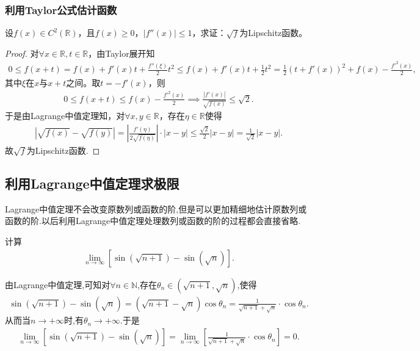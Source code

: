 \documentclass[../../main.tex]{subfiles}%
\begin{document}
\subsubsection{利用Taylor公式估计函数}

\begin{example}
设$f(x)\in C^2(\mathbb{R})$，且$f(x)\geqslant 0$，$|f''(x)|\leqslant 1$，求证：$\sqrt{f}$为Lipschitz函数。
\end{example}
\begin{proof}
对$\forall x\in\mathbb{R}, t\in\mathbb{R}$，由Taylor展开知
\begin{align*}
0\leqslant f(x+t)=f(x)+f'(x)t+\frac{f''(\xi)}{2}t^2\leqslant f(x)+f'(x)t+\frac{1}{2}t^2
= \frac{1}{2}(t+f'(x))^2 + f(x) - \frac{f'^2(x)}{2},
\end{align*}
其中$\xi$在$x$与$x+t$之间。取$t=-f'(x)$，则
\begin{align*}
0\leqslant f(x+t)\leqslant f(x) - \frac{f'^2(x)}{2} \implies \frac{|f'(x)|}{\sqrt{f(x)}}\leqslant \sqrt{2}.
\end{align*}
于是由Lagrange中值定理知，对$\forall x,y\in\mathbb{R}$，存在$\eta\in\mathbb{R}$使得
\begin{align*}
|\sqrt{f(x)} - \sqrt{f(y)}| = \left|\frac{f'(\eta)}{2\sqrt{f(\eta)}}\right|\cdot |x-y| \leqslant \frac{\sqrt{2}}{2}|x-y| = \frac{1}{\sqrt{2}}|x-y|.
\end{align*}
故$\sqrt{f}$为Lipschitz函数.
\end{proof}



\subsection{利用Lagrange中值定理求极限}
Lagrange中值定理不会改变原数列或函数的阶,但是可以更加精细地估计原数列或函数的阶.以后利用Lagrange中值定理处理数列或函数的阶的过程都会直接省略.

\begin{example}
计算
\begin{align*}
\lim_{n \to \infty} [\sin(\sqrt{n + 1}) - \sin(\sqrt{n})].
\end{align*}
\end{example}
\begin{solution}
由Lagrange中值定理,可知对$\forall n\in\mathbb{N}$,存在$\theta_n \in(\sqrt{n+1},\sqrt{n})$,使得
\begin{align*}
\sin(\sqrt{n+1})-\sin(\sqrt{n})=(\sqrt{n+1}-\sqrt{n})\cos\theta_n=\frac{1}{\sqrt{n+1}+\sqrt{n}}\cdot \cos\theta_n.
\end{align*}
从而当$n\to +\infty$时,有$\theta_n \to +\infty$.于是
\begin{align*}
\lim_{n \to \infty} [\sin(\sqrt{n + 1}) - \sin(\sqrt{n})]=\lim_{n \to \infty} [\frac{1}{\sqrt{n+1}+\sqrt{n}}\cdot \cos\theta_n]=0.
\end{align*}

\end{solution}
\end{document}
